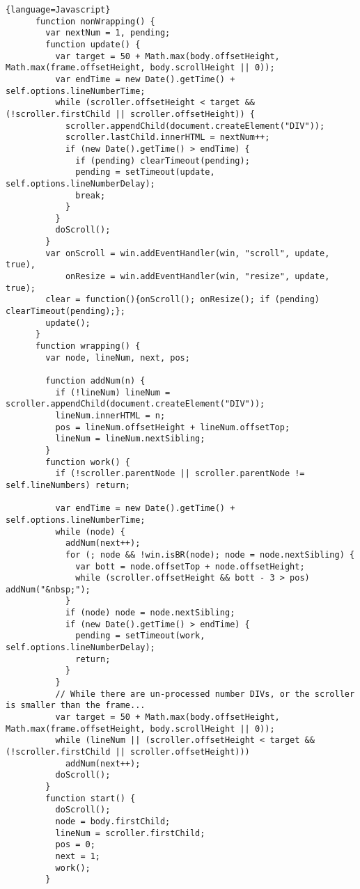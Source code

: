 \begin{lstlisting}{language=Javascript}
      function nonWrapping() {
        var nextNum = 1, pending;
        function update() {
          var target = 50 + Math.max(body.offsetHeight, Math.max(frame.offsetHeight, body.scrollHeight || 0));
          var endTime = new Date().getTime() + self.options.lineNumberTime;
          while (scroller.offsetHeight < target && (!scroller.firstChild || scroller.offsetHeight)) {
            scroller.appendChild(document.createElement("DIV"));
            scroller.lastChild.innerHTML = nextNum++;
            if (new Date().getTime() > endTime) {
              if (pending) clearTimeout(pending);
              pending = setTimeout(update, self.options.lineNumberDelay);
              break;
            }
          }
          doScroll();
        }
        var onScroll = win.addEventHandler(win, "scroll", update, true),
            onResize = win.addEventHandler(win, "resize", update, true);
        clear = function(){onScroll(); onResize(); if (pending) clearTimeout(pending);};
        update();
      }
      function wrapping() {
        var node, lineNum, next, pos;

        function addNum(n) {
          if (!lineNum) lineNum = scroller.appendChild(document.createElement("DIV"));
          lineNum.innerHTML = n;
          pos = lineNum.offsetHeight + lineNum.offsetTop;
          lineNum = lineNum.nextSibling;
        }
        function work() {
          if (!scroller.parentNode || scroller.parentNode != self.lineNumbers) return;

          var endTime = new Date().getTime() + self.options.lineNumberTime;
          while (node) {
            addNum(next++);
            for (; node && !win.isBR(node); node = node.nextSibling) {
              var bott = node.offsetTop + node.offsetHeight;
              while (scroller.offsetHeight && bott - 3 > pos) addNum("&nbsp;");
            }
            if (node) node = node.nextSibling;
            if (new Date().getTime() > endTime) {
              pending = setTimeout(work, self.options.lineNumberDelay);
              return;
            }
          }
          // While there are un-processed number DIVs, or the scroller is smaller than the frame...
          var target = 50 + Math.max(body.offsetHeight, Math.max(frame.offsetHeight, body.scrollHeight || 0));
          while (lineNum || (scroller.offsetHeight < target && (!scroller.firstChild || scroller.offsetHeight)))
            addNum(next++);
          doScroll();
        }
        function start() {
          doScroll();
          node = body.firstChild;
          lineNum = scroller.firstChild;
          pos = 0;
          next = 1;
          work();
        }


\end{lstlisting}
